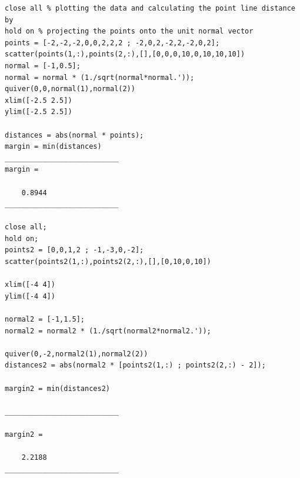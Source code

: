 \documentclass{article}
\begin{document}
    \begin{verbatim}
close all % plotting the data and calculating the point line distance by 
hold on % projecting the points onto the unit normal vector
points = [-2,-2,-2,0,0,2,2,2 ; -2,0,2,-2,2,-2,0,2];
scatter(points(1,:),points(2,:),[],[0,0,0,10,0,10,10,10])
normal = [-1,0.5];
normal = normal * (1./sqrt(normal*normal.'));
quiver(0,0,normal(1),normal(2))
xlim([-2.5 2.5])
ylim([-2.5 2.5])

distances = abs(normal * points);
margin = min(distances)
___________________________
margin =

    0.8944
___________________________

close all;
hold on;
points2 = [0,0,1,2 ; -1,-3,0,-2];
scatter(points2(1,:),points2(2,:),[],[0,10,0,10])

xlim([-4 4])
ylim([-4 4])

normal2 = [-1,1.5];
normal2 = normal2 * (1./sqrt(normal2*normal2.'));

quiver(0,-2,normal2(1),normal2(2))
distances2 = abs(normal2 * [points2(1,:) ; points2(2,:) - 2]);

margin2 = min(distances2)

___________________________

margin2 =

    2.2188
___________________________

\end{verbatim}
\normalsize
\newpage
\end{document}

